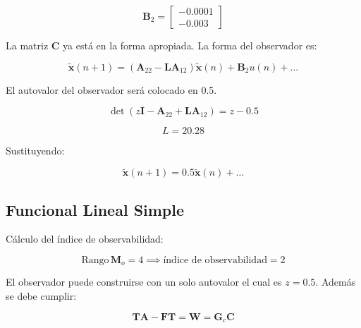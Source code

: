 \[
\mathbf{B}_2 = \begin{bmatrix} -0.0001 \\ -0.003 \end{bmatrix}
\]

La matriz $\mathbf{C}$ ya está en la forma apropiada. La forma del observador es:

\[
\tilde{\mathbf{x}}(n+1) = (\mathbf{A}_{22} - \mathbf{L}\mathbf{A}_{12})\tilde{\mathbf{x}}(n) + \mathbf{B}_2 u(n) + \dots
\]

El autovalor del observador será colocado en 0.5.

\[
\det(z\mathbf{I} - \mathbf{A}_{22} + \mathbf{L}\mathbf{A}_{12}) = z - 0.5
\]

\[
L = 20.28
\]

Sustituyendo:

\[
\tilde{\mathbf{x}}(n+1) = 0.5 \tilde{\mathbf{x}}(n) + \dots
\]

\subsection{Funcional Lineal Simple}

Cálculo del índice de observabilidad:

\[
\text{Rango} \, \mathbf{M}_o = 4 \implies \text{índice de observabilidad} = 2
\]

El observador puede construirse con un solo autovalor el cual es $z = 0.5$. Además se debe cumplir:

\[
\mathbf{T}\mathbf{A} - \mathbf{F}\mathbf{T} = \mathbf{W} = \mathbf{G}_c \mathbf{C}
\]

